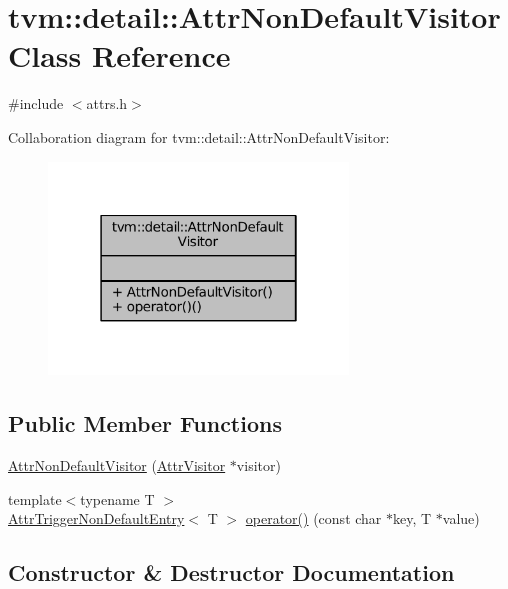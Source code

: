 \hypertarget{classtvm_1_1detail_1_1AttrNonDefaultVisitor}{}\section{tvm\+:\+:detail\+:\+:Attr\+Non\+Default\+Visitor Class Reference}
\label{classtvm_1_1detail_1_1AttrNonDefaultVisitor}


{\ttfamily \#include $<$attrs.\+h$>$}



Collaboration diagram for tvm\+:\+:detail\+:\+:Attr\+Non\+Default\+Visitor\+:
\nopagebreak
\begin{figure}[H]
\begin{center}
\leavevmode
\includegraphics[width=226pt]{classtvm_1_1detail_1_1AttrNonDefaultVisitor__coll__graph}
\end{center}
\end{figure}
\subsection*{Public Member Functions}
\begin{DoxyCompactItemize}
\item 
\hyperlink{classtvm_1_1detail_1_1AttrNonDefaultVisitor_a8b27d05c6de24ab60b999c227e346337}{Attr\+Non\+Default\+Visitor} (\hyperlink{classtvm_1_1AttrVisitor}{Attr\+Visitor} $\ast$visitor)
\item 
{\footnotesize template$<$typename T $>$ }\\\hyperlink{structtvm_1_1detail_1_1AttrTriggerNonDefaultEntry}{Attr\+Trigger\+Non\+Default\+Entry}$<$ T $>$ \hyperlink{classtvm_1_1detail_1_1AttrNonDefaultVisitor_aa359d725f84781937ffd4eeb4445fc66}{operator()} (const char $\ast$key, T $\ast$value)
\end{DoxyCompactItemize}


\subsection{Constructor \& Destructor Documentation}
